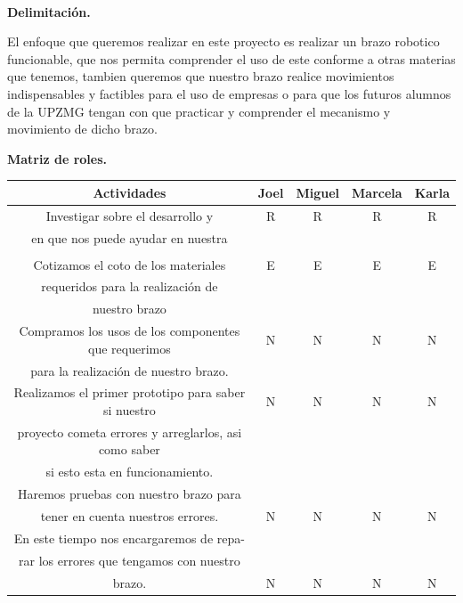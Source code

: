 \documentclass[letterpaper]{article}
\begin{document}
\vspace{1.8cm}\\
\begin{large}
    \begin{LARGE}
        \textbf{Delimitación.}\\
    \end{LARGE}
  El enfoque que queremos realizar en este proyecto es realizar un brazo robotico funcionable, que nos permita comprender el uso de este conforme a otras materias que tenemos, tambien queremos que nuestro brazo realice movimientos indispensables y factibles para el uso de empresas o para que los futuros alumnos de la UPZMG tengan con que practicar y comprender el mecanismo y movimiento de dicho brazo.
\end{large}

\begin{large}
    \begin{LARGE}
        \textbf{Matriz de roles.}\\
        
    \end{LARGE}
    

\begin{tabular}{c|c|c|c|c|}
\hline
    Actividades & Joel & Miguel & Marcela & Karla     \\ \hline
    Investigar sobre el desarrollo y   & R & R & R & R\\   
    en que nos puede ayudar en nuestra &   &   &   &  \\
     \\ \hline
    Cotizamos el coto de los materiales & E & E & E & E \\
    requeridos para la realización de   &   &   &   &   \\
    nuestro brazo                       &   &   &   &   \\ \hline
    Compramos los usos de los componentes que requerimos & N & N & N & N \\
    para la realización de nuestro brazo.                &   &   &   &   \\ \hline
    Realizamos el primer prototipo para saber si nuestro & N & N & N & N \\
    proyecto cometa errores y arreglarlos, asi como saber &  &   &   &   \\
     si esto esta en funcionamiento.                     &   &   &   &   \\ \hline
    Haremos pruebas con nuestro brazo para\\ tener en cuenta nuestros errores.   &  N   &  N  &  N  &  N \\ \hline
    En este tiempo nos encargaremos de repa-\\ rar los errores que tengamos con nuestro\\ brazo. &  N  &   N  &   N   &  N \\\hline
 
\end{tabular}
\end{large}\\ \newpage
\end{document}

